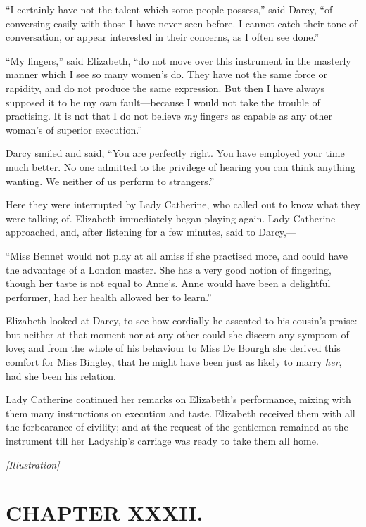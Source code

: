 \documentclass[12pt]{book}
\begin{document}
``I certainly have not the talent which some people possess,'' said Darcy, ``of conversing easily with those I have never seen before. I cannot catch their tone of conversation, or appear interested in their concerns, as I often see done.''

``My fingers,'' said Elizabeth, ``do not move over this instrument in the masterly manner which I see so many women's do. They have not the same force or rapidity, and do not produce the same expression. But then I have always supposed it to be my own fault---because I would not take the trouble of practising. It is not that I do not believe \textit{my} fingers as capable as any other woman's of superior execution.''

Darcy smiled and said, ``You are perfectly right. You have employed your time much better. No one admitted to the privilege of hearing you can think anything wanting. We neither of us perform to strangers.''

Here they were interrupted by Lady Catherine, who called out to know what they were talking of. Elizabeth immediately began playing again. Lady Catherine approached, and, after listening for a few minutes, said to Darcy,---

``Miss Bennet would not play at all amiss if she practised more, and could have the advantage of a London master. She has a very good notion of fingering, though her taste is not equal to Anne's. Anne would have been a delightful performer, had her health allowed her to learn.''

Elizabeth looked at Darcy, to see how cordially he assented to his cousin's praise: but neither at that moment nor at any other could she discern any symptom of love; and from the whole of his behaviour to Miss De Bourgh she derived this comfort for Miss Bingley, that he might have been just as likely to marry \textit{her}, had she been his relation.

Lady Catherine continued her remarks on Elizabeth's performance, mixing with them many instructions on execution and taste. Elizabeth received them with all the forbearance of civility; and at the request of the gentlemen remained at the instrument till her Ladyship's carriage was ready to take them all home.

\emph{[Illustration]}

\chapter{CHAPTER XXXII.}
\end{document}
